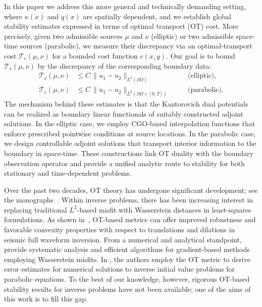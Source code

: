 \documentclass[12pt]{amsart}
\begin{document}
In this paper we address this more general and technically demanding setting, where $\kappa(x)$ and $q(x)$ are spatially dependent, and we establish global stability estimates expressed in terms of optimal transport (OT) cost. More precisely, given two admissible sources $\mu$ and $\nu$ (elliptic) or two admissible space-time sources (parabolic), we measure their discrepancy via an optimal-transport cost $\mathcal{T}_c(\mu,\nu)$ for a bounded cost function $c(x,y)$. 
Our goal is to bound $\mathcal{T}_c(\mu,\nu)$ by the discrepancy of the corresponding boundary data:
\[
\begin{aligned}
\mathcal{T}_c(\mu,\nu) &\le C\,\|u_1-u_2\|_{L^2(\partial\Omega)}
\quad &&\text{(elliptic)},\\[0.5ex]
\mathcal{T}_c(\mu,\nu) &\le C\,\|u_1-u_2\|_{L^2(\partial\Omega\times[0,T])}
\quad &&\text{(parabolic)}.
\end{aligned}
\]
The mechanism behind these estimates is that the Kantorovich dual potentials can be realized as boundary linear functionals of suitably constructed adjoint solutions. 
In the elliptic case, we employ CGO-based interpolation functions that enforce prescribed pointwise conditions at source locations. In the parabolic case, we design controllable adjoint solutions that transport interior information to the boundary in space-time. These constructions link OT duality with the boundary observation operator and provide a unified analytic route to stability for both stationary and time-dependent problems.

Over the past two decades, OT theory has undergone significant development; see the monographs~\cite{villani_optimal_2009,villani2003topics,alessio_figalli_invitation_2023}. 
Within inverse problems, there has been increasing interest in replacing traditional $L^2$-based misfit with Wasserstein distances in least-squares formulations. As shown in~\cite{engquist_application_2014,engquist_optimal_2022}, OT-based metrics can offer improved robustness and favorable convexity properties with respect to translations and dilations in seismic full waveform inversion.
From a numerical and analytical standpoint, \cite{qiu_full-waveform_2017,qiu_analysis_2021} provide systematic analysis and efficient algorithms for gradient-based methods employing Wasserstein misfits. In \cite{liu_moments_2025}, the authors employ the OT metric to derive error estimates for numerical solutions to inverse initial value problems for parabolic equations. To the best of our knowledge, however, rigorous OT-based stability results for inverse problems have not been available; one of the aims of this work is to fill this gap.
\end{document}
